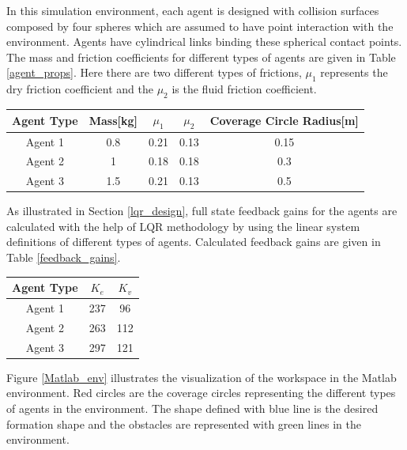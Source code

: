 In this simulation environment, each agent is designed with collision surfaces composed by four spheres which are assumed to have point interaction with the environment. Agents have cylindrical links binding these spherical contact points. The mass and friction coefficients for different types of agents are given in Table \ref{agent_props}. Here there are two different types of frictions, $\mu_1$ represents the dry friction coefficient and the $\mu_2$ is the fluid friction coefficient.

\begin{center}
 \label{agent_props} 
\begin{tabular}{||c| c| c |c |c||}
				
\hline
\textbf{Agent Type} & \textbf{Mass[kg]}  & \textbf{$\mu_1$} & \textbf{$\mu_2$} & \textbf{Coverage Circle Radius[m]} \\ 
\hline
Agent 1& 0.8 & 0.21  & 0.13 & 0.15\\
Agent 2& 1   &  0.18 & 0.18 & 0.3\\	
Agent 3& 1.5 &  0.21 & 0.13 & 0.5\\	
\hline
\end{tabular}
\end{center}

As illustrated in Section \ref{lqr_design}, full state feedback gains for the agents are calculated with the help of LQR methodology by using the linear system definitions of different types of agents. Calculated feedback gains are given in Table \ref{feedback_gains}.

\begin{center}
 \label{feedback_gains} 
\begin{tabular}{||c| c |c||}
				
\hline
\textbf{Agent Type} & \textbf{$K_e$}  & \textbf{$K_v$} \\ 
\hline
Agent 1& 237 & 96\\
Agent 2& 263 & 112\\
Agent 3& 297 & 121\\
\hline
\end{tabular}
\end{center}

Figure \ref{Matlab_env} illustrates the visualization of the workspace in the Matlab environment. Red circles are the coverage circles representing the different types of agents in the environment. The shape defined with blue line is the desired formation shape and the obstacles are represented with green lines in the environment. 

